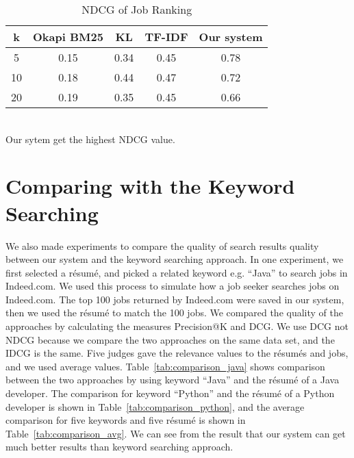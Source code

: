 \begin{table}[ht]
\caption{NDCG of Job Ranking } %
\centering %
\begin{tabular}{    | c | c | c | c | c |  }
 \hline
       k    & Okapi BM25 & KL    & TF-IDF & Our system  \\
 \hline
       5    & 0.15       & 0.34  & 0.45     & 0.78   \\
 \hline
       10   & 0.18       & 0.44  & 0.47     & 0.72   \\
 \hline
       20   & 0.19       & 0.35  & 0.45     & 0.66   \\
 \hline

\end{tabular}
\label{tab:job_ndcg} %
\\Our sytem get the highest NDCG value.
\end{table}

\section{Comparing with the Keyword Searching}
We also made experiments to compare the quality of search results quality between our system and the keyword searching approach. In one experiment, we first selected a r\'esum\'e, and picked a related keyword e.g. ``Java''  to search jobs in Indeed.com. We used this process to simulate how a job seeker searches jobs on Indeed.com. The top 100 jobs returned by Indeed.com were saved in our system, then we used the r\'esum\'e to match the 100 jobs. We compared the quality of the approaches by calculating the measures Precision@K  and  DCG. We use DCG not NDCG because we compare the two approaches on the same data set, and the IDCG is the same. Five judges gave the relevance values to the r\'esum\'es and jobs, and we used average values. Table~\ref{tab:comparison_java} shows comparison between the two approaches by using keyword ``Java'' and the r\'esum\'e of a Java developer. The comparison for  keyword ``Python'' and the r\'esum\'e of a Python developer is shown in Table~\ref{tab:comparison_python}, and the average comparison for five keywords and five r\'esum\'e is shown in Table~\ref{tab:comparison_avg}. We can see from the result that our system can get much better results than keyword searching approach.

